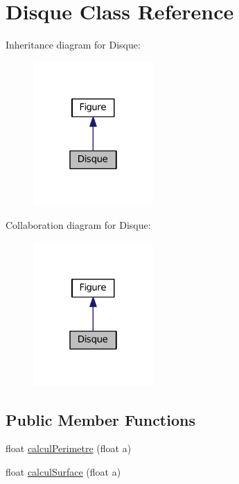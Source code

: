 \hypertarget{classDisque}{}\section{Disque Class Reference}
\label{classDisque}


Inheritance diagram for Disque\+:
\nopagebreak
\begin{figure}[H]
\begin{center}
\leavevmode
\includegraphics[width=130pt]{classDisque__inherit__graph}
\end{center}
\end{figure}


Collaboration diagram for Disque\+:
\nopagebreak
\begin{figure}[H]
\begin{center}
\leavevmode
\includegraphics[width=130pt]{classDisque__coll__graph}
\end{center}
\end{figure}
\subsection*{Public Member Functions}
\begin{DoxyCompactItemize}
\item 
float \hyperlink{classDisque_a699609023203ea173b117df83f5c55bd}{calcul\+Perimetre} (float a)
\item 
float \hyperlink{classDisque_a6a721908949195bc8c8c0388c034b30a}{calcul\+Surface} (float a)
\end{DoxyCompactItemize}

